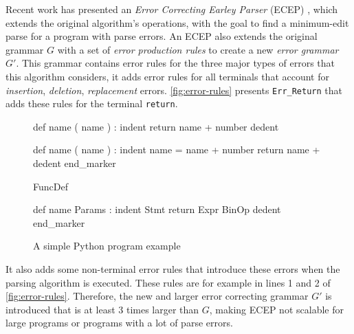  Recent work has presented an \emph{Error
Correcting Earley Parser} (ECEP) \citep{Aho_1972}, which extends the original
algorithm's operations, with the goal to find a minimum-edit parse for a program
with parse errors. An ECEP also extends the original grammar $G$ with a set of
\emph{error production rules} to create a new \emph{error grammar} $G'$. This
grammar contains error rules for the three major types of errors that this
algorithm considers, \ie it adds error rules for all terminals that account for
\emph{insertion}, \emph{deletion}, \emph{replacement} errors.
\autoref{fig:error-rules} presents \texttt{Err\_Return} that adds these rules
for the terminal \texttt{return}.

\begin{figure}[t]
\centering
\begin{minipage}[c]{0.54\linewidth}
\begin{ecode}
def name ( name ) : \n
indent return name + number \n
dedent \n

def name ( name ) : \n
indent name = name + number \n
return name + \n
dedent end_marker
\end{ecode}
\label{fig:prog-seq}
\end{minipage}%
\hspace{0.02\linewidth}%
\begin{minipage}[c]{0.44\linewidth}
\begin{ecode}
FuncDef \n

def name Params : \n
indent Stmt \n
return Expr BinOp \n
dedent end_marker
\end{ecode}
\label{fig:abstract-prog-seq}
\end{minipage}
\caption{A simple Python program example}
\end{figure}

It also adds some non-terminal error rules that introduce these errors when the
parsing algorithm is executed. These rules are for example in lines 1 and 2 of
\autoref{fig:error-rules}. Therefore, the new and larger error correcting
grammar $G'$ is introduced that is at least 3 times larger than $G$, making ECEP
not scalable for large programs or programs with a lot of parse errors.

